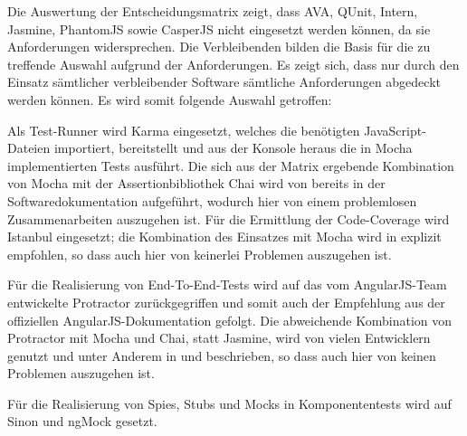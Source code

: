 	Die Auswertung der Entscheidungsmatrix zeigt, dass AVA, QUnit, Intern, Jasmine, PhantomJS sowie CasperJS nicht eingesetzt werden können, da sie Anforderungen widersprechen. Die Verbleibenden bilden die Basis für die zu treffende Auswahl aufgrund der Anforderungen. Es zeigt sich, dass nur durch den Einsatz sämtlicher verbleibender Software sämtliche Anforderungen abgedeckt werden können. Es wird somit folgende Auswahl getroffen:
	
	Als Test-Runner wird Karma eingesetzt, welches die benötigten JavaScript-Dateien importiert, bereitstellt und aus der Konsole heraus die in Mocha implementierten Tests ausführt. Die sich aus der Matrix ergebende Kombination von Mocha mit der Assertionbibliothek Chai wird von \textcite{mocha-index} bereits in der Softwaredokumentation aufgeführt, wodurch hier von einem problemlosen Zusammenarbeiten auszugehen ist. Für die Ermittlung der Code-Coverage wird Istanbul eingesetzt; die Kombination des Einsatzes mit Mocha wird in  \cite{istanbul} explizit empfohlen, so dass auch hier von keinerlei Problemen auszugehen ist.
	
	Für die Realisierung von End-To-End-Tests wird auf das vom AngularJS-Team entwickelte Protractor zurückgegriffen und somit auch der Empfehlung aus der offiziellen AngularJS-Dokumentation  \cite{angular-e2e} gefolgt. Die abweichende Kombination von Protractor mit Mocha und Chai, statt Jasmine, wird von vielen Entwicklern genutzt und unter Anderem in  \cite{protractormocha-1} und  \cite{protractormocha-2} beschrieben, so dass auch hier von keinen Problemen auszugehen ist.
	
	Für die Realisierung von Spies, Stubs und Mocks in Komponententests wird auf Sinon und ngMock gesetzt.
